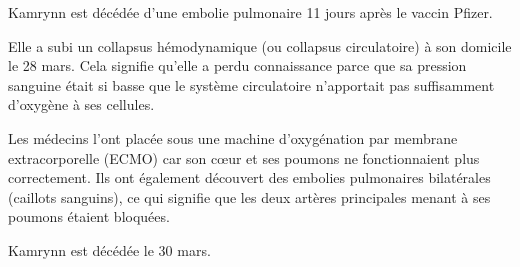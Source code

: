 Kamrynn est décédée d'une embolie pulmonaire 11 jours après le vaccin Pfizer.

Elle a subi un collapsus hémodynamique (ou collapsus circulatoire) à son
domicile le 28 mars. Cela signifie qu'elle a perdu connaissance parce que sa
pression sanguine était si basse que le système circulatoire n'apportait pas
suffisamment d'oxygène à ses cellules.

Les médecins l'ont placée sous une machine d'oxygénation par membrane
extracorporelle (ECMO) car son cœur et ses poumons ne fonctionnaient plus
correctement. Ils ont également découvert des embolies pulmonaires bilatérales
(caillots sanguins), ce qui signifie que les deux artères principales menant à
ses poumons étaient bloquées.

Kamrynn est décédée le 30 mars.

